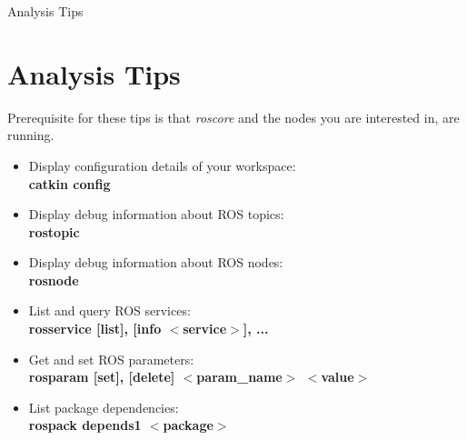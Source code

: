 \documentclass[11pt]{beamer}
\newcommand{\nologo}{\setbeamertemplate{logo}{}}
\newcommand{\reducedfontsize}{\fontsize{7pt}{8.4}\selectfont}
\begin{document}
	{\nologo\reducedfontsize
	\begin{frame}{Analysis Tips}
		\section{Analysis Tips}
		Prerequisite for these tips is that \textit{roscore} and the nodes you are interested in, are running.
		\begin{itemize}
			\item{Display configuration details of your workspace:\\ \textbf{catkin config}}
			\item{Display debug information about ROS topics:\\ \textbf{rostopic}}
			\item{Display debug information about ROS nodes:\\ \textbf{rosnode}}
			\item{List and query ROS services:\\ \textbf{rosservice [list], [info $<$service$>$], ...}}
			\item{Get and set ROS parameters:\\ \textbf{rosparam [set], [delete]  $<$param\_name$>$ $<$value$>$}}
			\item{List package dependencies:\\ \textbf{rospack depends1 $<$package$>$}}
		\end{itemize}
	\end{frame}}
\end{document}
